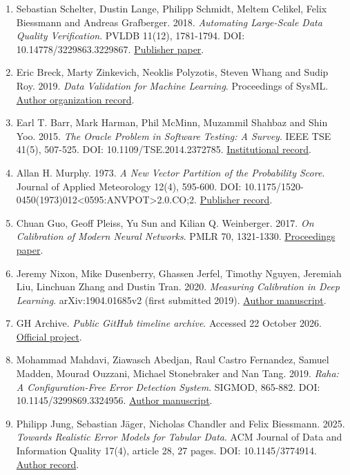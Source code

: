 \begin{enumerate}
\def\labelenumi{\arabic{enumi}.}
\tightlist
\item
  Sebastian Schelter, Dustin Lange, Philipp Schmidt, Meltem Celikel,
  Felix Biessmann and Andreas Grafberger. 2018. \emph{Automating
  Large-Scale Data Quality Verification}. PVLDB 11(12), 1781-1794. DOI:
  10.14778/3229863.3229867.
  \href{https://www.vldb.org/pvldb/vol11/p1781-schelter.pdf}{Publisher
  paper}.
\item
  Eric Breck, Marty Zinkevich, Neoklis Polyzotis, Steven Whang and Sudip
  Roy. 2019. \emph{Data Validation for Machine Learning}. Proceedings of
  SysML.
  \href{https://research.google/pubs/data-validation-for-machine-learning/}{Author
  organization record}.
\item
  Earl T. Barr, Mark Harman, Phil McMinn, Muzammil Shahbaz and Shin Yoo.
  2015. \emph{The Oracle Problem in Software Testing: A Survey}. IEEE
  TSE 41(5), 507-525. DOI: 10.1109/TSE.2014.2372785.
  \href{https://discovery.ucl.ac.uk/id/eprint/1471263/}{Institutional
  record}.
\item
  Allan H. Murphy. 1973. \emph{A New Vector Partition of the Probability
  Score}. Journal of Applied Meteorology 12(4), 595-600. DOI:
  10.1175/1520-0450(1973)012\textless0595:ANVPOT\textgreater2.0.CO;2.
  \href{https://journals.ametsoc.org/view/journals/apme/12/4/1520-0450_1973_012_0595_anvpot_2_0_co_2.xml}{Publisher
  record}.
\item
  Chuan Guo, Geoff Pleiss, Yu Sun and Kilian Q. Weinberger. 2017.
  \emph{On Calibration of Modern Neural Networks}. PMLR 70, 1321-1330.
  \href{https://proceedings.mlr.press/v70/guo17a.html}{Proceedings
  paper}.
\item
  Jeremy Nixon, Mike Dusenberry, Ghassen Jerfel, Timothy Nguyen,
  Jeremiah Liu, Linchuan Zhang and Dustin Tran. 2020. \emph{Measuring
  Calibration in Deep Learning}. arXiv:1904.01685v2 (first submitted
  2019). \href{https://arxiv.org/abs/1904.01685v2}{Author manuscript}.
\item
  GH Archive. \emph{Public GitHub timeline archive}. Accessed 22 October
  2026. \href{https://www.gharchive.org/}{Official project}.
\item
  Mohammad Mahdavi, Ziawasch Abedjan, Raul Castro Fernandez, Samuel
  Madden, Mourad Ouzzani, Michael Stonebraker and Nan Tang. 2019.
  \emph{Raha: A Configuration-Free Error Detection System}. SIGMOD,
  865-882. DOI: 10.1145/3299869.3324956.
  \href{https://raulcastrofernandez.com/papers/raha.pdf}{Author
  manuscript}.
\item
  Philipp Jung, Sebastian Jäger, Nicholas Chandler and Felix Biessmann.
  2025. \emph{Towards Realistic Error Models for Tabular Data}. ACM
  Journal of Data and Information Quality 17(4), article 28, 27 pages.
  DOI: 10.1145/3774914.
  \href{https://foundationmodels.bht-berlin.de/publication/jung-2025-realistic-error-models/}{Author
  record}.
\end{enumerate}

